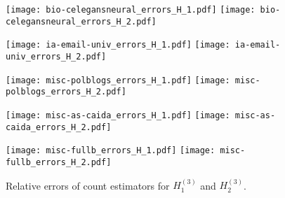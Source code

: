 \begin{figure}[th!]
\begin{center}

\minipage{\myplotwidth}
  \texttt{[image: bio-celegansneural\_errors\_H\_1.pdf]}
\endminipage\hfill
\minipage{\myplotwidth}
  \texttt{[image: bio-celegansneural\_errors\_H\_2.pdf]}
\endminipage

\hspace*{\fill}
\vskip 1pt
\hspace*{\fill}

\minipage{\myplotwidth}%
  \texttt{[image: ia-email-univ\_errors\_H\_1.pdf]}
\endminipage\hfill
\minipage{\myplotwidth}
  \texttt{[image: ia-email-univ\_errors\_H\_2.pdf]}
\endminipage

\hspace*{\fill}
\vskip 1pt
\hspace*{\fill}

\minipage{\myplotwidth}%
  \texttt{[image: misc-polblogs\_errors\_H\_1.pdf]}
\endminipage\hfill
\minipage{\myplotwidth}
  \texttt{[image: misc-polblogs\_errors\_H\_2.pdf]}
\endminipage

\hspace*{\fill}
\vskip 1pt
\hspace*{\fill}

\minipage{\myplotwidth}%
  \texttt{[image: misc-as-caida\_errors\_H\_1.pdf]}
\endminipage\hfill
\minipage{\myplotwidth}
  \texttt{[image: misc-as-caida\_errors\_H\_2.pdf]}
\endminipage

\hspace*{\fill}
\vskip 1pt
\hspace*{\fill}

\minipage{\myplotwidth}%
  \texttt{[image: misc-fullb\_errors\_H\_1.pdf]}
\endminipage\hfill
\minipage{\myplotwidth}
  \texttt{[image: misc-fullb\_errors\_H\_2.pdf]}
\endminipage
\hspace*{\fill}
\end{center}
\caption{Relative errors of count estimators for $H_1^{(3)}$ and $H_2^{(3)}$.}
\label{fig:relative_errors}
\end{figure}

